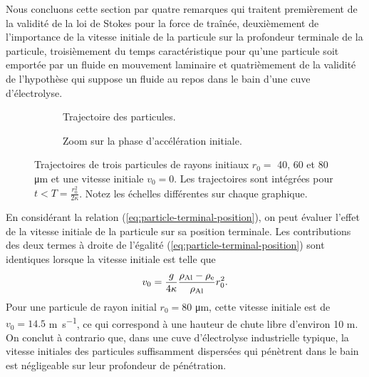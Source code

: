 Nous concluons cette section par quatre remarques qui traitent
premièrement de la validité de la loi de Stokes pour la force de traînée,
deuxièmement de l'importance de la vitesse initiale de la particule
sur la profondeur terminale de la particule, troisièmement du temps
caractéristique pour qu'une particule soit emportée par un fluide en
mouvement laminaire et quatrièmement de la validité de l'hypothèse qui
suppose un fluide au repos dans le bain d'une cuve d'électrolyse.

\begin{figure}
 \begin{center}
    \begin{subfigure}[b]{0.49\textwidth}
      
      \caption{Trajectoire des particules.}
      \label{fig:particle-trajectories-a}
    \end{subfigure}
    \begin{subfigure}[b]{0.49\textwidth}
      
      \caption{Zoom sur la phase d'accélération initiale.}
      \label{fig:particle-trajectories-b}
    \end{subfigure}

    \caption{Trajectoires de trois particules de rayons initiaux $r_0 =
      $ 40, 60 et 80 \si{\micro\meter} et une vitesse initiale $v_0 =
      0$. Les trajectoires sont intégrées pour $t < T =
      \frac{r_0^2}{2\kappa}$. Notez les échelles différentes sur
      chaque graphique.}
    \label{fig:particle-trajectories}
  \end{center}
\end{figure}

\begin{remarque}
  En considérant la relation (\ref{eq:particle-terminal-position}), on
  peut évaluer l'effet de la vitesse initiale de la particule sur sa
  position terminale. Les contributions des deux termes à droite de
  l'égalité (\ref{eq:particle-terminal-position}) sont identiques
  lorsque la vitesse initiale est telle que
  \begin{equation*}
    v_0 = \frac{g}{4\kappa}\frac{\rho_\mathrm{Al} -
      \rho_\mathrm{e}}{\rho_\mathrm{Al}} r_0^2.
  \end{equation*}
  Pour une particule de rayon initial $r_0 = \num{80}$
  \si{\micro\meter}, cette vitesse initiale est de $v_0 = \num{14.5}$
  \si{\meter\per\second}, ce qui correspond à une hauteur de chute
  libre d'environ \num{10} \si{\meter}. On conclut à contrario que,
  dans une cuve d'électrolyse industrielle typique, la vitesse
  initiales des particules suffisamment dispersées qui pénètrent dans
  le bain est négligeable sur leur profondeur de pénétration.
\end{remarque}

